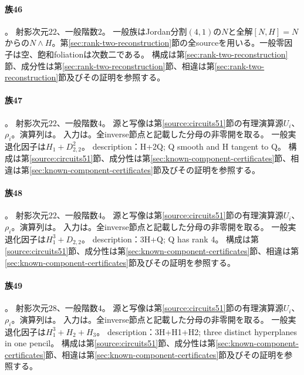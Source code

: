 \paragraph{族46}\label{catalogue:R2_AFF41}
。
射影次元$22$、一般階数$2$。
一般族はJordan分割$(4,1)$の$N$と全解$[N,H]=N$からの$N\wedge H$。第\ref{sec:rank-two-reconstruction}節の全sourceを用いる。一般零因子は空、飽和foliationは次数二である。
構成は第\ref{sec:rank-two-reconstruction}節、成分性は第\ref{sec:rank-two-reconstruction}節、相違は第\ref{sec:rank-two-reconstruction}節及びその証明を参照する。

\paragraph{族47}\label{catalogue:R4_DOUBLE_SMOOTH_QUADRIC}
。
射影次元$22$、一般階数$4$。
源と写像は第\ref{source:circuits51}節の有理演算源$U_i$、$\rho_i$。演算列は。
入力は。全inverse節点と記載した分母の非零開を取る。
一般実退化因子は$H_{1}+D_{2,2}^{2}$。
description：H+2Q; Q smooth and H tangent to Q。
構成は第\ref{source:circuits51}節、成分性は第\ref{sec:known-component-certificates}節、相違は第\ref{sec:known-component-certificates}節及びその証明を参照する。

\paragraph{族48}\label{catalogue:R4_TRIPLE_HYPERPLANE_QUADRIC}
。
射影次元$22$、一般階数$4$。
源と写像は第\ref{source:circuits51}節の有理演算源$U_i$、$\rho_i$。演算列は。
入力は。全inverse節点と記載した分母の非零開を取る。
一般実退化因子は$H_{1}^{3}+D_{2,2}$。
description：3H+Q; Q has rank 4。
構成は第\ref{source:circuits51}節、成分性は第\ref{sec:known-component-certificates}節、相違は第\ref{sec:known-component-certificates}節及びその証明を参照する。

\paragraph{族49}\label{catalogue:R4_CA}
。
射影次元$28$、一般階数$4$。
源と写像は第\ref{source:circuits51}節の有理演算源$U_i$、$\rho_i$。演算列は。
入力は。全inverse節点と記載した分母の非零開を取る。
一般実退化因子は$H_{1}^{3}+H_{2}+H_{3}$。
description：3H+H1+H2; three distinct hyperplanes in one pencil。
構成は第\ref{source:circuits51}節、成分性は第\ref{sec:known-component-certificates}節、相違は第\ref{sec:known-component-certificates}節及びその証明を参照する。


